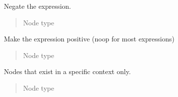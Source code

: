 \documentclass[a4paper,10pt,english]{sphinxmanual}
\begin{document}

\begin{fulllineitems}
\label{extensions:jinja2.nodes.Not}
Negate the expression.
\begin{quote}\begin{description}
\item[{Node type}] \leavevmode
{\hyperref[extensions:jinja2.nodes.UnaryExpr]{}}

\end{description}\end{quote}

\end{fulllineitems}


\begin{fulllineitems}
\label{extensions:jinja2.nodes.Pos}
Make the expression positive (noop for most expressions)
\begin{quote}\begin{description}
\item[{Node type}] \leavevmode
{\hyperref[extensions:jinja2.nodes.UnaryExpr]{}}

\end{description}\end{quote}

\end{fulllineitems}


\begin{fulllineitems}
\label{extensions:jinja2.nodes.Helper}
Nodes that exist in a specific context only.
\begin{quote}\begin{description}
\item[{Node type}] \leavevmode
{\hyperref[extensions:jinja2.nodes.Node]{}}

\end{description}\end{quote}

\end{fulllineitems}

\end{document}
